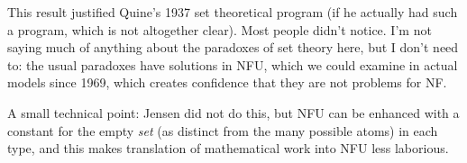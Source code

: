 \documentclass{slides}
\begin{document}
\begin{slide}


This result justified Quine's 1937 set theoretical program (if he actually had such a program, which is not altogether clear).  Most people didn't notice.  I'm not saying much of anything about the paradoxes of set theory here, but I don't need to:  the usual paradoxes have solutions in NFU, which we could examine in actual models since 1969, which creates confidence that they are not problems for NF.

A small technical point:  Jensen did not do this, but NFU can be enhanced with a constant for the empty {\em set\/} (as distinct from the many possible atoms) in each type, and this makes translation of mathematical work into NFU less laborious.


\end{slide}
\end{document}
